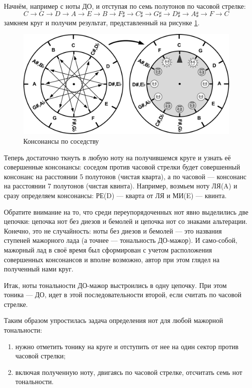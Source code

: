 Начнём, например с ноты ДО, и отступая по семь полутонов по часовой стрелке:
\[
    C\rightarrow 
    G\rightarrow 
    D\rightarrow 
    A\rightarrow 
    E\rightarrow 
    B\rightarrow 
    {F\sharp}\rightarrow
    {C\sharp}\rightarrow
    {G\sharp}\rightarrow
    {D\sharp}\rightarrow
    {A\sharp}\rightarrow
    F\rightarrow 
    C
\]
замкнем круг и получим результат, представленный на рисунке \ref{fig:harmony:kvinto-kvarto:kons-rearrange}.

\begin{figure}[!ht]
    \centering
    \includegraphics[scale=0.7]{fig/kvinto-kvarto/kons-rearrange} 
    \caption{Консонансы по соседству}\label{fig:harmony:kvinto-kvarto:kons-rearrange}
\end{figure} 

Теперь достаточно ткнуть в любую ноту на получившемся круге и узнать её совершенные консонансы: соседом против часовой стрелки будет совершенный консонанс на расстоянии 5 полутонов (чистая кварта), а по часовой --- консонанс на расстоянии 7 полутонов (чистая квинта). Например, возмьем ноту ЛЯ(A) и сразу определяем консонансы: РЕ(D) --- кварта от ЛЯ и МИ(E) --- квинта.

Обратите внимание на то, что среди переупорядоченных нот явно выделились две цепочки: цепочка нот без диезов и бемолей и цепочка нот со знаками альтерации. Конечно, это не случайность: ноты без диезов и бемолей --- это названия ступеней мажорного лада (а точнее --- тональность ДО-мажор). И само-собой, мажорный лад в своё время был сформирован с учетом расположения совершенных консонансов и вполне возможно, автор при этом глядел на полученный нами круг.

Итак, ноты тональности ДО-мажор выстроились в одну цепочку. При этом тоника --- ДО, идет в этой последовательности второй, если считать по часовой стрелке.

Таким образом упростилась задача определения нот для любой мажорной тональности: 
\begin{enumerate}
    \item нужно отметить тонику на круге и отступить от нее на один сектор против часовой стрелки;
    \item включая полученную ноту, двигаясь по часовой стрелке, отсчитать семь нот тональности.
\end{enumerate}

